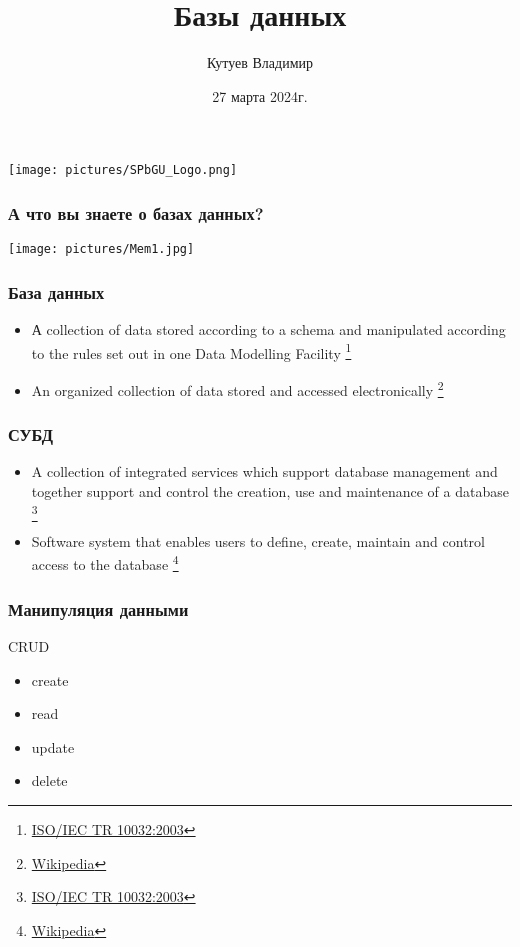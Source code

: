 \documentclass[aspectratio=169]{beamer}
\title[Базы данных]{Базы данных}
\subtitle[]{}
\institute[СПбГУ]{
Программная инженерия \\
Санкт-Петербургский государственный университет
}
\author[Кутуев Владимир]{Кутуев Владимир}
\date{27 марта 2024г.}
\begin{document}
{
\begin{frame}
  \texttt{[image: pictures/SPbGU\_Logo.png]}
  \vspace{-20pt}
  \begin{center}
    \titlepage
  \end{center}
\end{frame}
}

\begin{frame}[fragile]
  \transwipe[direction=90]
  \frametitle{А что вы знаете о базах данных?}
  
  \begin{center}
    \texttt{[image: pictures/Mem1.jpg]}
  \end{center}
\end{frame}


\begin{frame}[fragile]
  \transwipe[direction=90]
  \frametitle{База данных}
  
  \begin{itemize}
    \item А collection of data stored according to a schema and manipulated according to the rules set out in one Data Modelling Facility \footnote{\href{https://www.iso.org/obp/ui/\#iso:std:iso-iec:tr:10032:ed-1:v1:en}{ISO/IEC TR 10032:2003}}
    \item An organized collection of data stored and accessed electronically \footnote{\href{https://en.wikipedia.org/wiki/Database}{Wikipedia}}
  \end{itemize}
\end{frame}

\begin{frame}[fragile]
  \transwipe[direction=90]
  \frametitle{СУБД}
  
  \begin{itemize}
    \item A collection of integrated services which support database management and together support and control the creation, use and maintenance of a database \footnote{\href{https://www.iso.org/obp/ui/\#iso:std:iso-iec:tr:10032:ed-1:v1:en}{ISO/IEC TR 10032:2003}}
    \item Software system that enables users to define, create, maintain and control access to the database \footnote{\href{https://en.wikipedia.org/wiki/Database\#Database_management_system}{Wikipedia}}
  \end{itemize}
\end{frame}

\begin{frame}[fragile]
  \transwipe[direction=90]
  \frametitle{Манипуляция данными}

  CRUD
  \begin{itemize}
    \item create
    \item read
    \item update
    \item delete
  \end{itemize}
\end{frame}
\end{document}
